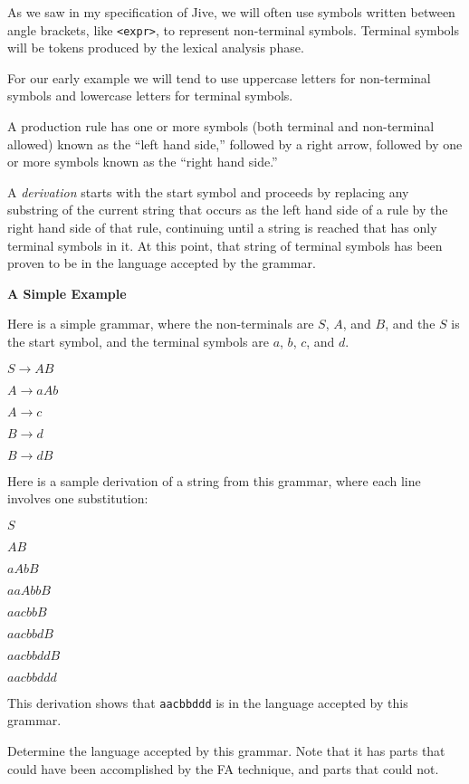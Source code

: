   As we saw in my specification of Jive, we will often use symbols written between angle brackets,
  like {\tt <expr>}, to represent
  non-terminal symbols.
  Terminal symbols will be tokens produced by the lexical analysis phase.
   \medskip
   
   For our early example we will tend to use uppercase letters for non-terminal symbols and
   lowercase letters for terminal symbols.
\Outdent

A production rule has one or more symbols (both terminal and non-terminal allowed) known
as the ``left hand side,'' followed
by a right arrow, followed by one or more symbols known as the ``right hand side.''
\medskip

A {\it derivation\/} starts with the start symbol and proceeds by replacing any substring of
the current string that occurs as the left hand side of a rule by the right hand side of that rule,
continuing until a string is reached that has only terminal symbols in it.  At this point, that
string of terminal symbols has been proven to be in the language accepted by the grammar.
\medskip

{\bf A Simple Example}
\medskip

Here is a simple grammar, where the non-terminals are $S$, $A$, and $B$, and the
$S$ is the start symbol,
and the terminal symbols are $a$, $b$, $c$, and $d$.
\medskip

$ S \rightarrow AB $

$ A \rightarrow a A b $

$ A \rightarrow c $

$ B \rightarrow d $

$ B \rightarrow d B $
\medskip

Here is a sample derivation of a string from this grammar, where each line
involves one substitution:
\medskip

$S$

$AB$

$ a A b B$

$ a a A b b B$

$ a a c b b B $

$ a a c b b d B $

$ a a c b b d d B $

$ a a c b b d d d $

\medskip

This derivation shows that {\tt aacbbddd} is in the language accepted by this grammar.
\medskip

\doit Determine the language accepted by this grammar.  Note that it
has parts that could have been accomplished by the FA technique, and parts that
could not.
\border

